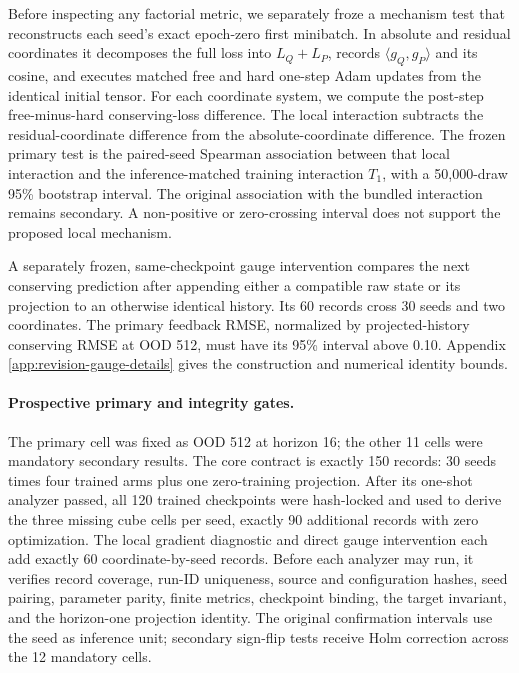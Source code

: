 \documentclass{article}
\begin{document}
Before inspecting any factorial metric, we separately froze a mechanism test that reconstructs
each seed's exact epoch-zero first minibatch. In absolute and residual coordinates it decomposes
the full loss into $L_Q+L_P$, records $\langle g_Q,g_P\rangle$ and its cosine, and executes matched
free and hard one-step Adam updates from the identical initial tensor. For each coordinate system,
we compute the post-step free-minus-hard conserving-loss difference. The local interaction
subtracts the residual-coordinate difference from the absolute-coordinate difference. The
frozen primary test is the paired-seed Spearman association between that local
interaction and the inference-matched training interaction $T_1$, with a 50,000-draw 95\%
bootstrap interval. The original association with the bundled interaction remains secondary.
A non-positive or zero-crossing interval does not support the proposed local mechanism.

A separately frozen, same-checkpoint gauge intervention compares the next
conserving prediction after appending either a compatible raw state or its
projection to an otherwise identical history. Its 60 records cross 30 seeds
and two coordinates. The primary feedback RMSE, normalized by projected-history
conserving RMSE at OOD 512, must have its 95\% interval above 0.10. Appendix
\ref{app:revision-gauge-details} gives the construction and numerical identity bounds.

\paragraph{Prospective primary and integrity gates.}
The primary cell was fixed as OOD 512 at horizon 16; the other 11 cells were mandatory secondary
results. The core contract is exactly 150 records: 30 seeds times four trained arms plus one
zero-training projection. After its one-shot analyzer passed, all 120 trained checkpoints were
hash-locked and used to derive the three missing cube cells per seed, exactly 90 additional records
with zero optimization. The local gradient diagnostic and direct gauge intervention each add
exactly 60 coordinate-by-seed records. Before
each analyzer may run, it verifies record coverage, run-ID uniqueness, source and configuration
hashes, seed pairing, parameter parity, finite metrics, checkpoint binding, the target invariant,
and the horizon-one projection identity. The original confirmation intervals use the seed as inference unit;
secondary sign-flip tests receive Holm correction across the 12 mandatory cells.
\end{document}

